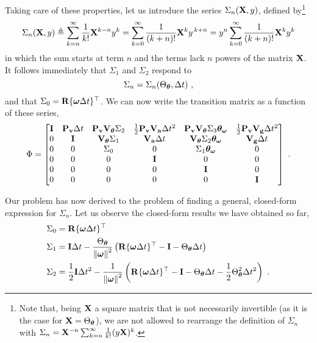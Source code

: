 Taking care of these properties, let us introduce the series $\Sigma_n({\bf X},y)$, defined by\footnote{Note that, being ${\bf X}$ a square matrix that is not necessarily invertible (as it is the case for ${\bf X}=\Theta_{\bm \theta}$), we are not allowed to rearrange the definition of $\Sigma_n$ with $\Sigma_n={\bf X}^{-n}\sum_{k=n}^\infty\frac{1}{k!}(y{\bf X})^{k}$.}
%
\begin{equation}
\Sigma_n({\bf X},y) \triangleq \sum_{k=n}^\infty \frac{1}{k!}{\bf X}^{k-n}y^k = \sum_{k=0}^\infty \frac{1}{(k+n)!}{\bf X}^{k}y^{\,k+n}= y^n\sum_{k=0}^\infty \frac{1}{(k+n)!}{\bf X}^k y^k
\end{equation}
%
in which the sum starts at term $n$ and the terms lack $n$ powers of the matrix ${\bf X}$. 
It follows immediately that $\Sigma_1$ and $\Sigma_2$ respond to 
%
\begin{equation}
\Sigma_n=\Sigma_n(\Theta_{\bm \theta},\Delta t)~,
\end{equation}
%
and that $\Sigma_0 = {\bf R}\{{\bm \omega}\Delta t\}^{\top}$. 
We can now write the transition matrix  as a function of these series,
%
\begin{equation}
\Phi = \begin{bmatrix}
{\bf I} & {\bf P}_{\bf v}\Delta t & {\bf P}_{\bf v}{\bf V}_{\bm \theta}\Sigma_2 &  \tfrac12{\bf P}_{\bf v}{\bf V}_{\bf a}\Delta t^2 & {\bf P}_{\bf v}{\bf V}_{\bm \theta}\Sigma_3{\bm \theta}_{\bm \omega} & \tfrac12{\bf P}_{\bf v}{\bf V}_{\bf g}\Delta t^2 \\
0 & {\bf I} & {\bf V}_{\bm \theta}\Sigma_1 &  {\bf V}_{\bf a}\Delta t & {\bf V}_{\bm \theta}\Sigma_2{\bm \theta}_{\bm \omega} & {\bf V}_{\bf g}\Delta t \\
0 & 0 & \Sigma_0 &  0 & \Sigma_1{\bm \theta}_{\bm \omega} & 0 \\
0 & 0 & 0 & {\bf I} & 0 & 0 \\
0 & 0 & 0 & 0 & {\bf I} & 0 \\
0 & 0 & 0 & 0 & 0 & {\bf I} \\
\end{bmatrix}~.\label{equ:fullIMUtranmat}
\end{equation}

Our problem has now derived to the problem of finding a general, closed-form expression for $\Sigma_n$. 
Let us observe the closed-form results we have obtained so far,
%
%
\begin{align}
\Sigma_0 &= {\bf R}\{{\bm \omega}\Delta t\}^{\top} \\
\Sigma_1 &=
  {\bf I}\Delta t 
- \frac{\Theta_{\bm \theta}}{{\left\|{\bm \omega}\right\|}^2}\left({\bf R}\{{\bm \omega}\Delta t\}^{\top} - {\bf I} - \Theta_{\bm \theta}\Delta t \right) \\
\Sigma_2 &= 
  \frac12 {\bf I}\Delta t^2
- \frac{1}{{\left\|{\bm \omega}\right\|}^2}\left(
  {\bf R}\{{\bm \omega}\Delta t\}^{\top} - {\bf I} - \Theta_{\bm \theta}\Delta t - \frac12\Theta_{\bm \theta}^2\Delta t^2
 \right)~.
\end{align}%

